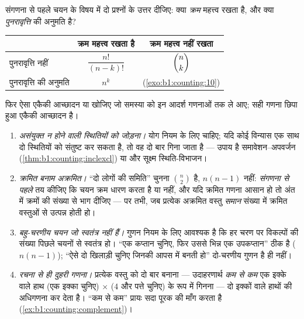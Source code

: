 \begin{method}[कौन-सी गणना लागू होती है?]\label{met:b1:counting:which}
संगणना से पहले चयन के विषय में दो प्रश्नों के उत्तर दीजिए: क्या \emph{क्रम}
महत्त्व रखता है, और क्या \emph{पुनरावृत्ति} की अनुमति है?
\begin{center}
\renewcommand{\arraystretch}{1.4}
\begin{tabular}{l|c|c}
 & क्रम महत्त्व रखता है & क्रम महत्त्व नहीं रखता \\ \hline पुनरावृत्ति नहीं
 & $\dfrac{n!}{(n-k)!}$ & $\dbinom{n}{k}$ \\[6pt] पुनरावृत्ति की अनुमति &
 $n^k$ & (\cref{exo:b1:counting:10}) \\
\end{tabular}
\end{center}
फिर ऐसा एकैकी आच्छादन या  खोजिए जो समस्या को इन आदर्श गणनाओं तक ले आए;
सही गणना छिपा हुआ एकैकी आच्छादन है।
\end{method}

\begin{remark}[गणना में सामान्य भूलें]\label{rem:b1:counting:pitfalls}
\begin{enumerate}
  \item \emph{असंयुक्त न होने वाली स्थितियों को जोड़ना।} योग नियम के लिए
   चाहिए; यदि कोई विन्यास एक साथ दो स्थितियों को संतुष्ट कर सकता है,
  तो वह दो बार गिना जाता है --- उपाय है समावेशन--अपवर्जन
  (\cref{thm:b1:counting:inclexcl}) या और सूक्ष्म स्थिति-विभाजन।
  \item \emph{क्रमित बनाम अक्रमित।} ``दो लोगों की समिति'' चुनना $\binom n2$
  है, $n(n-1)$ नहीं: \emph{संगणना से पहले} तय कीजिए कि चयन क्रम धारण करता है
  या नहीं, और यदि क्रमित गणना आसान हो तो अंत में क्रमों की संख्या से भाग
  दीजिए --- पर तभी, जब प्रत्येक अक्रमित वस्तु \emph{समान} संख्या में क्रमित
  वस्तुओं से उत्पन्न होती हो।
  \item \emph{बहु-चरणीय चयन जो स्वतंत्र नहीं हैं।} गुणन नियम के लिए आवश्यक
  है कि हर चरण पर विकल्पों की संख्या पिछले चयनों से स्वतंत्र हो। ``एक कप्तान
  चुनिए, फिर उससे भिन्न एक उपकप्तान'' ठीक है ($n(n-1)$); ``ऐसे दो खिलाड़ी
  चुनिए जिनकी आपस में बनती हो'' दो-चरणीय गुणन है ही नहीं।
  \item \emph{रचना से ही दुहरी गणना।} प्रत्येक वस्तु को दो बार बनाना ---
  उदाहरणार्थ \emph{कम से कम} एक इक्के वाले हाथ (एक इक्का चुनिए) $\times$
  ($4$ और पत्ते चुनिए) के रूप में गिनना --- दो इक्कों वाले हाथों की अधिगणना
  कर देता है। ``कम से कम'' प्रायः सदा पूरक की माँग करता है
  (\cref{ex:b1:counting:complement})।
\end{enumerate}
\end{remark}

